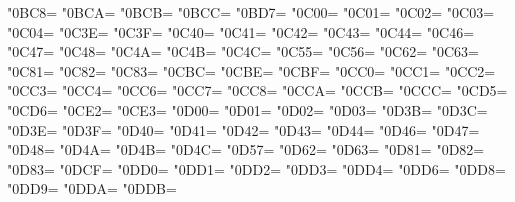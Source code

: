\XeTeXcharclass"0BC8=\KclassCM
\XeTeXcharclass"0BCA=\KclassCM
\XeTeXcharclass"0BCB=\KclassCM
\XeTeXcharclass"0BCC=\KclassCM
\XeTeXcharclass"0BD7=\KclassCM
\XeTeXcharclass"0C00=\KclassCM
\XeTeXcharclass"0C01=\KclassCM
\XeTeXcharclass"0C02=\KclassCM
\XeTeXcharclass"0C03=\KclassCM
\XeTeXcharclass"0C04=\KclassCM
\XeTeXcharclass"0C3E=\KclassCM
\XeTeXcharclass"0C3F=\KclassCM
\XeTeXcharclass"0C40=\KclassCM
\XeTeXcharclass"0C41=\KclassCM
\XeTeXcharclass"0C42=\KclassCM
\XeTeXcharclass"0C43=\KclassCM
\XeTeXcharclass"0C44=\KclassCM
\XeTeXcharclass"0C46=\KclassCM
\XeTeXcharclass"0C47=\KclassCM
\XeTeXcharclass"0C48=\KclassCM
\XeTeXcharclass"0C4A=\KclassCM
\XeTeXcharclass"0C4B=\KclassCM
\XeTeXcharclass"0C4C=\KclassCM
\XeTeXcharclass"0C55=\KclassCM
\XeTeXcharclass"0C56=\KclassCM
\XeTeXcharclass"0C62=\KclassCM
\XeTeXcharclass"0C63=\KclassCM
\XeTeXcharclass"0C81=\KclassCM
\XeTeXcharclass"0C82=\KclassCM
\XeTeXcharclass"0C83=\KclassCM
\XeTeXcharclass"0CBC=\KclassCM
\XeTeXcharclass"0CBE=\KclassCM
\XeTeXcharclass"0CBF=\KclassCM
\XeTeXcharclass"0CC0=\KclassCM
\XeTeXcharclass"0CC1=\KclassCM
\XeTeXcharclass"0CC2=\KclassCM
\XeTeXcharclass"0CC3=\KclassCM
\XeTeXcharclass"0CC4=\KclassCM
\XeTeXcharclass"0CC6=\KclassCM
\XeTeXcharclass"0CC7=\KclassCM
\XeTeXcharclass"0CC8=\KclassCM
\XeTeXcharclass"0CCA=\KclassCM
\XeTeXcharclass"0CCB=\KclassCM
\XeTeXcharclass"0CCC=\KclassCM
\XeTeXcharclass"0CD5=\KclassCM
\XeTeXcharclass"0CD6=\KclassCM
\XeTeXcharclass"0CE2=\KclassCM
\XeTeXcharclass"0CE3=\KclassCM
\XeTeXcharclass"0D00=\KclassCM
\XeTeXcharclass"0D01=\KclassCM
\XeTeXcharclass"0D02=\KclassCM
\XeTeXcharclass"0D03=\KclassCM
\XeTeXcharclass"0D3B=\KclassCM
\XeTeXcharclass"0D3C=\KclassCM
\XeTeXcharclass"0D3E=\KclassCM
\XeTeXcharclass"0D3F=\KclassCM
\XeTeXcharclass"0D40=\KclassCM
\XeTeXcharclass"0D41=\KclassCM
\XeTeXcharclass"0D42=\KclassCM
\XeTeXcharclass"0D43=\KclassCM
\XeTeXcharclass"0D44=\KclassCM
\XeTeXcharclass"0D46=\KclassCM
\XeTeXcharclass"0D47=\KclassCM
\XeTeXcharclass"0D48=\KclassCM
\XeTeXcharclass"0D4A=\KclassCM
\XeTeXcharclass"0D4B=\KclassCM
\XeTeXcharclass"0D4C=\KclassCM
\XeTeXcharclass"0D57=\KclassCM
\XeTeXcharclass"0D62=\KclassCM
\XeTeXcharclass"0D63=\KclassCM
\XeTeXcharclass"0D81=\KclassCM
\XeTeXcharclass"0D82=\KclassCM
\XeTeXcharclass"0D83=\KclassCM
\XeTeXcharclass"0DCF=\KclassCM
\XeTeXcharclass"0DD0=\KclassCM
\XeTeXcharclass"0DD1=\KclassCM
\XeTeXcharclass"0DD2=\KclassCM
\XeTeXcharclass"0DD3=\KclassCM
\XeTeXcharclass"0DD4=\KclassCM
\XeTeXcharclass"0DD6=\KclassCM
\XeTeXcharclass"0DD8=\KclassCM
\XeTeXcharclass"0DD9=\KclassCM
\XeTeXcharclass"0DDA=\KclassCM
\XeTeXcharclass"0DDB=\KclassCM

